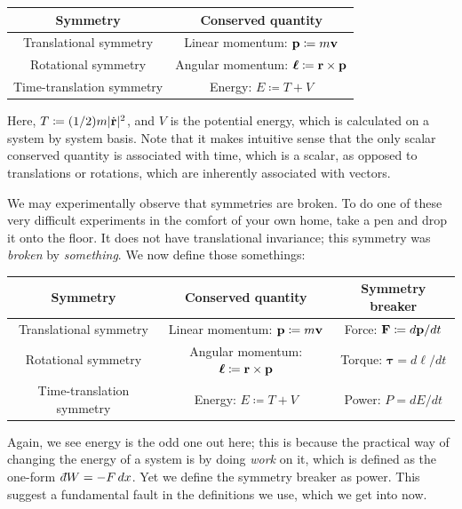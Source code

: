 \documentclass[11pt]{article}
\begin{document}
\begin{table}[H]
    \centering
    \begin{tabular}{|c|c|}
        \hline
        Symmetry & Conserved quantity\\
        \hline
        Translational symmetry & Linear momentum: $\mathbf{p} \coloneqq m \mathbf{v}$\\
        Rotational symmetry & Angular momentum: $\boldsymbol{\ell} \coloneqq \mathbf{r} \times \mathbf{p}$\\
        Time-translation symmetry & Energy: $E \coloneqq T + V$\\
        \hline
    \end{tabular}
\end{table}

Here, $T \coloneqq (1/2) m |\dot{\mathbf{r}}|^2$, and $V$ is the potential
energy, which is calculated on a system by system basis. Note that it makes intuitive sense that the only scalar
conserved quantity is associated with time, which is a scalar,
as opposed to translations or rotations, which are inherently
associated with vectors.

We may experimentally observe that symmetries are broken.
To do one of these very difficult experiments in the comfort of your
own home, take a pen and drop it onto the floor. It does not
have translational invariance; this symmetry was \emph{broken}
by \emph{something}. We now define those somethings:


\begin{table}[H]
    \centering
    \begin{tabular}{|c|c|c|}
        \hline
        Symmetry & Conserved quantity & Symmetry breaker\\
        \hline
        Translational symmetry & Linear momentum: $\mathbf{p} \coloneqq m \mathbf{v}$ & Force: $\mathbf{F} \coloneqq d\mathbf{p}/dt$\\
        Rotational symmetry & Angular momentum: $\boldsymbol{\ell} \coloneqq \mathbf{r} \times \mathbf{p}$ & Torque: $\boldsymbol{\tau} = d\boldsymbol{\ell}/dt$\\
        Time-translation symmetry & Energy: $E \coloneqq T + V$ & Power: $P = dE/dt$\\
        \hline
    \end{tabular}
\end{table}

Again, we see energy is the odd one out here; this is because
the practical way of changing the energy of a system is by
doing \emph{work} on it, which is defined as the one-form $\dbar W = - F \, dx$.
Yet we define the symmetry breaker as power. This suggest a fundamental
fault in the definitions we use, which we get into now.
\end{document}

